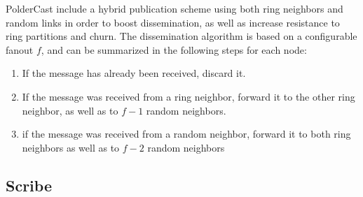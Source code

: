 PolderCast include a hybrid publication scheme using both
ring neighbors and random links in order to boost
dissemination, as well as increase resistance to ring
partitions and churn. The dissemination algorithm is based
on a configurable fanout $f$, and can be summarized in the
following steps for each node:

\begin{enumerate}
    \item If the message has already been received, discard it.
    \item If the message was received from a ring neighbor, forward it
        to the other ring neighbor, as well as to $f-1$ random
        neighbors.
    \item if the message was received from a random neighbor,
        forward it to both ring neighbors as well as to $f-2$ random
        neighbors
\end{enumerate}

\subsection{Scribe}

